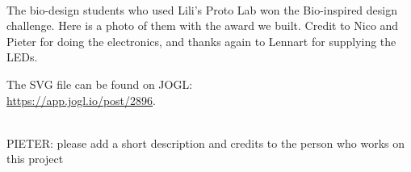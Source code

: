 \documentclass{report}
\begin{document}
 \\

The bio-design students who used Lili's Proto Lab won the Bio-inspired design challenge. Here is a photo of them with the award we built. Credit to Nico and Pieter for doing the electronics, and thanks again to Lennart for supplying the LEDs.

The SVG file can be found on JOGL:\\
\url{https://app.jogl.io/post/2896}.

\clearpage
\begin{figure}
    \centering
\end{figure}
\clearpage

 \\

PIETER: please add a short description and credits to the person who works on this project

\clearpage
\begin{figure}
    \centering
\end{figure}
\clearpage
\end{document}
